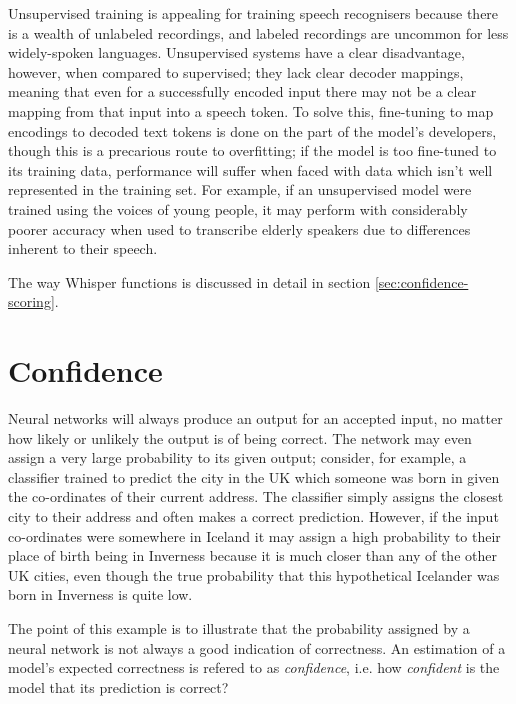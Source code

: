 Unsupervised training is appealing for training speech recognisers because there is a wealth of unlabeled recordings, and labeled recordings are uncommon for less widely-spoken languages\cite{baevski2021}.
Unsupervised systems have a clear disadvantage, however, when compared to supervised; they lack clear decoder mappings\cite{whisper}, meaning that even for a successfully encoded input there may not be a clear mapping from that input into a speech token.
To solve this, fine-tuning to map encodings to decoded text tokens is done on the part of the model's developers, though this is a precarious route to overfitting;
if the model is too fine-tuned to its training data, performance will suffer when faced with data which isn't well represented in the training set.
For example, if an unsupervised model were trained using the voices of young people, it may perform with considerably poorer accuracy when used to transcribe elderly speakers due to differences inherent to their speech\cite{Horton2010}.

The way Whisper functions is discussed in detail in section \ref{sec:confidence-scoring}.

\section{Confidence}\label{sec:litreview-confidence}
Neural networks will always produce an output for an accepted input, no matter how likely or unlikely the output is of being correct.
The network may even assign a very large probability to its given output; consider, for example, a classifier trained to predict the city in the UK which someone was born in given the co-ordinates of their current address.
The classifier simply assigns the closest city to their address and often makes a correct prediction.
However, if the input co-ordinates were somewhere in Iceland it may assign a high probability to their place of birth being in Inverness because it is much closer than any of the other UK cities, even though the true probability that this hypothetical Icelander was born in Inverness is quite low.

The point of this example is to illustrate that the probability assigned by a neural network is not always a good indication of correctness.
An estimation of a model's expected correctness is refered to as \emph{confidence}, i.e. how \emph{confident} is the model that its prediction is correct?



